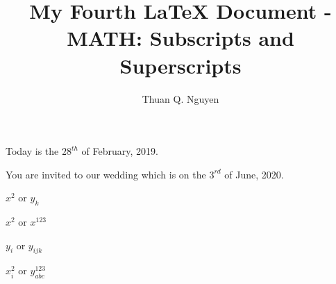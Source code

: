 \documentclass{article}
\begin{document}
\title{My Fourth \LaTeX{} Document - MATH: Subscripts and Superscripts}
\author{Thuan Q. Nguyen}
\maketitle

Today is the $28^{th}$ of February, 2019.

You are invited to our wedding which is on the $3^{rd}$ of June, 2020.

$x^2$ or $y_k$				%

$x^2$ or $x^{123}$			%

$y_i$ or $y_{ijk}$			%


$x^2_i$ or $y^{123}_{abc}$ 	%
\end{document}

